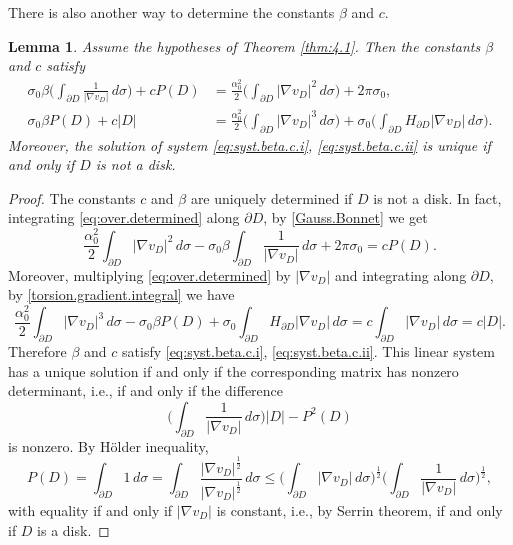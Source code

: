 \documentclass[10pt,reqno,a4paper]{article}
\numberwithin{equation}{section}
\theoremstyle{plain}
\newtheorem{lemma}[theorem]{Lemma}
\theoremstyle{definition}
\newcommand{\s}{\sigma}
\newcommand{\pa}{\partial}
\newcommand{\grad}{\nabla}
\begin{document}
There is also another way to determine the constants $\beta$ and $c$. 
\begin{lemma}
Assume the hypotheses of Theorem \ref{thm:4.1}. 
Then the constants $\beta$ and $c$ satisfy 
\begin{align} 
\sigma_0 \beta \Big( \int_{\pa D} \frac{1}{|\nabla v_D|} \, d\sigma \Big) 
+ c P(D) 
& = \frac{\alpha_0^2}{2} \Big( \int_{\pa D} |\nabla v_D|^{2} \, d\sigma \Big) 
+ 2 \pi \sigma_0,
\label{eq:syst.beta.c.i} 
\\
\sigma_0 \beta P(D) 
+ c|D| 
& = \frac{\alpha_0^2}{2} \Big( \int_{\pa D} |\nabla v_D|^{3}\, d\sigma \Big) 
+ \sigma_0 \Big( \int_{\pa D} H_{\pa D} |\nabla v_D| \, d\sigma \Big).
\label{eq:syst.beta.c.ii}
\end{align}
Moreover, the solution of system \eqref{eq:syst.beta.c.i}, \eqref{eq:syst.beta.c.ii} 
is unique if and only if $D$ is not a disk.
\end{lemma}

\begin{proof}
The constants $c$ and $\beta$ are uniquely determined if $D$ is not a disk.
In fact, integrating \eqref{eq:over.determined} along $\pa D$, 
by \eqref{Gauss.Bonnet} we get
\[
\frac{\alpha_0^2}{2}\int_{\pa D} |\nabla v_D|^{2} \, d\sigma 
- \sigma_0 \beta \int_{\pa D} \frac{1}{ |\nabla v_D| }\, d\sigma  
+ 2 \pi \sigma_0 = c P(D).
\]
Moreover, multiplying \eqref{eq:over.determined} by $|\nabla v_D|$ 
and integrating along $\pa D$, by \eqref{torsion.gradient.integral} we have
\[
\frac{\alpha_0^2}{2}\int_{\pa D}  | \nabla v_D|^{3}\, d\sigma -\sigma_0\beta P(D) + \sigma_0 \int_{\pa D}H_{\pa D}|\nabla v_D|\, d\sigma= c\int_{\pa D} |\nabla v_D|\,d\s=c|D|.
\]
Therefore $\beta$ and $c$ satisfy \eqref{eq:syst.beta.c.i}, \eqref{eq:syst.beta.c.ii}.
This linear system has a unique solution if and only if the corresponding matrix has nonzero determinant, 
i.e., if and only if the difference  
\[
\Big( \int_{\pa D} \frac{1}{|\grad v_D|} \, d\sigma \Big) |D| - P^2(D)
\]
is nonzero.  
By H\"older inequality, 
\[
P(D) = \int_{\pa D} 1 \, d\sigma 
= \int_{\pa D} \frac{ |\grad v_D|^{\frac12} }{ |\grad v_D|^{\frac12} } \, d\sigma 
\leq 
\Big( \int_{\pa D} |\grad v_D| \, d\sigma \Big)^{\frac12} 
\Big( \int_{\pa D} \frac{1}{|\grad v_D|} \, d\sigma \Big)^{\frac12},
\]
with equality if and only if $|\nabla v_D|$ is constant, 
i.e., by Serrin theorem, if and only if $D$ is a disk. 
\end{proof}
\end{document}
